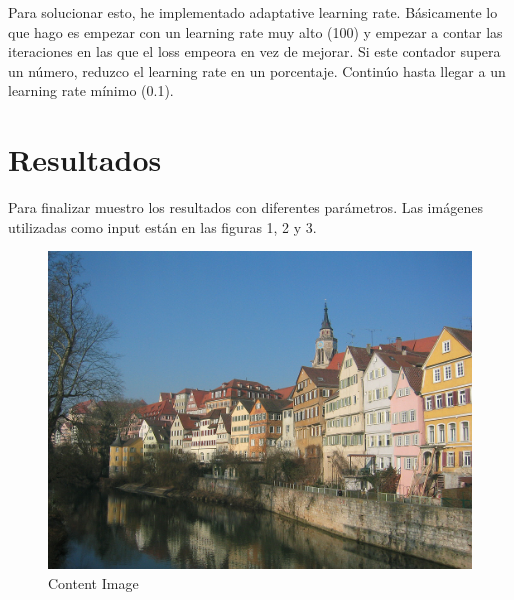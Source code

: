 \documentclass[a4paper, 11pt]{article}
\begin{document}
   				Para solucionar esto, he implementado adaptative learning rate. Básicamente lo que hago es empezar con un learning rate muy alto (100) y empezar a contar las iteraciones en las que el loss empeora en vez de mejorar. Si este contador supera un número, reduzco el learning rate en un porcentaje. Continúo hasta llegar a un learning rate mínimo (0.1).
   				
   		\section{Resultados}
				Para finalizar muestro los resultados con diferentes parámetros. Las imágenes utilizadas como input están en las figuras 1, 2 y 3.
				
				\begin{figure}[htb!]
					\begin{minipage}{1\textwidth}
						\centering
						\includegraphics[scale=.5]{../data/content_bridge}
						\caption{Content Image}
					\end{minipage}\hfill
				\end{figure}
				
\end{document}
